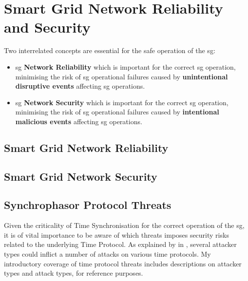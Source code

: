 \section{Smart Grid Network Reliability and Security}

Two interrelated concepts are essential for the safe operation of the \acrshort{sg}:  
\begin{itemize}
    \item \acrlong{sg} \textbf{Network Reliability } which is important for the correct \acrshort{sg} operation, minimising the risk of \acrshort{sg} operational failures caused by \textbf{unintentional disruptive events} affecting \acrshort{sg} operations.
    
    \item \acrlong{sg} \textbf{Network Security}  which is important for the correct \acrshort{sg} operation, minimising the risk of \acrshort{sg} operational failures caused by \textbf{intentional malicious events}  affecting \acrshort{sg} operations.
\end{itemize}



\subsection{Smart Grid Network Reliability}

\subsection{Smart Grid Network Security}




    

\subsection{Synchrophasor  Protocol Threats}
Given the criticality of Time Synchronisation for the correct operation of the \acrshort{sg}, it is of vital importance to be aware of which threats imposes security risks related to the underlying Time Protocol. As explained by \citeauthor{mizrahi2014security} in \Cite{mizrahi2014security}, several attacker types could inflict a number of attacks on various time protocols. My introductory coverage of time protocol threats includes descriptions on attacker types and attack types, for reference purposes.








